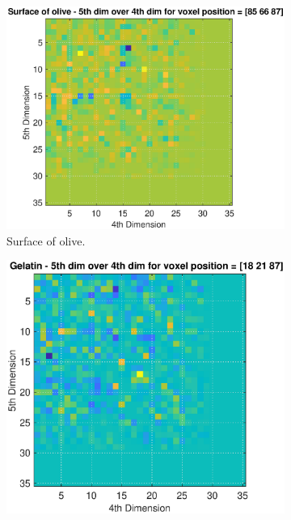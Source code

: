 \begin{figure}[H]
     \centering
     \begin{subfigure}[b]{0.47\textwidth}
         \centering
        \includegraphics[width=1.09\linewidth]{Graphics/Results/skin_pulp_stone_5D_4D_Stone.eps}
         \caption{Surface of olive. }
         \label{fig:res:5D_4D_skin_pulp_compare_stone}
     \end{subfigure}
     \hfill
     \begin{subfigure}[b]{0.47\textwidth}
         \centering
         \includegraphics[width=1.09\textwidth]{Graphics/Results/skin_pulp_stone_5D_4D_Pulp.eps}

\end{subfigure}
\end{figure}
